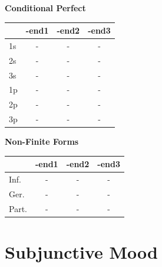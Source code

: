 \documentclass{book}
\begin{document}
\vspace{0.5cm}
\noindent
\begin{minipage}{0.32\textwidth}
\centering
\textbf{Conditional Perfect} \\ \vspace{0.1cm}
\begin{tabular}{lccc} \toprule & -end1 & -end2 & -end3 \\ \midrule 1s & - & - & - \\ 2s & - & - & - \\ 3s & - & - & - \\ 1p & - & - & - \\ 2p & - & - & - \\ 3p & - & - & - \\ \bottomrule \end{tabular}
\end{minipage}\hfill
\begin{minipage}{0.32\textwidth}
\centering
\textbf{Non-Finite Forms} \\ \vspace{0.1cm}
\begin{tabular}{lccc} \toprule & -end1 & -end2 & -end3 \\ \midrule Inf. & - & - & - \\ Ger. & - & - & - \\ Part. & - & - & - \\ \bottomrule \end{tabular}
\end{minipage}\hfill
\begin{minipage}{0.32\textwidth}
\end{minipage}

\newpage
\section{Subjunctive Mood}
\end{document}
